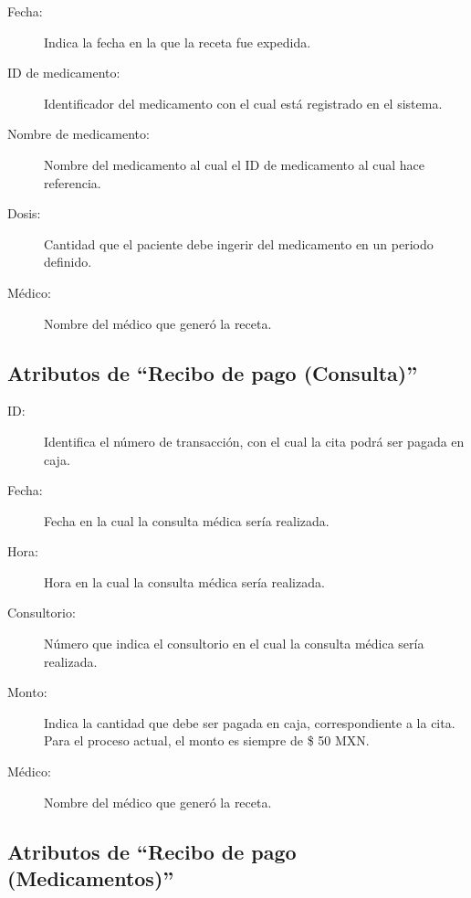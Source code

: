 \begin{description}
	\item[Fecha: ] Indica la fecha en la que la receta fue expedida.
	\item[ID de medicamento: ] Identificador del medicamento con el cual est\'a registrado en el sistema.
	\item[Nombre de medicamento: ] Nombre del medicamento al cual el ID de medicamento al cual hace referencia.
	\item[Dosis: ] Cantidad que el paciente debe ingerir del medicamento en un periodo definido.
	\item[M\'edico: ] Nombre del m\'edico que gener\'o la receta.
\end{description}
\subsection{Atributos de ``Recibo de pago (Consulta)''}

\begin{description}
	\item[ID: ] Identifica el n\'umero de transacci\'on, con el cual la cita podr\'a ser pagada en caja.
	\item[Fecha: ] Fecha en la cual la consulta m\'edica ser\'ia realizada.
	\item[Hora: ] Hora en la cual la consulta m\'edica ser\'ia realizada.
	\item[Consultorio: ] N\'umero que indica el consultorio en el cual la consulta m\'edica ser\'ia realizada.
	\item[Monto: ] Indica la cantidad que debe ser pagada en caja, correspondiente a la cita. Para el proceso actual, el monto es siempre de \$ 50 MXN.
	\item[M\'edico: ] Nombre del m\'edico que gener\'o la receta.
\end{description}
\subsection{Atributos de ``Recibo de pago (Medicamentos)''}


